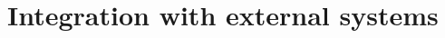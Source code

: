 \documentclass[Main]{subfiles}
\begin{document}
\chapter{Integration with external systems}\label{cha:F}



\end{document}
